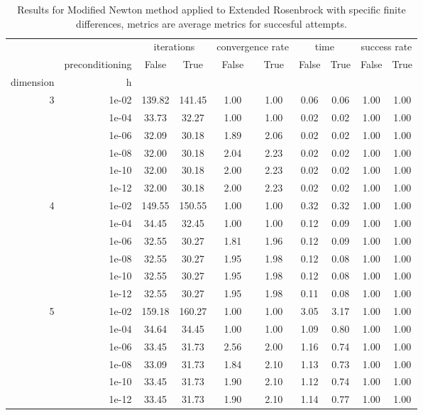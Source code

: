 \begin{table}
\centering
\caption{Results for Modified Newton method applied to Extended Rosenbrock with specific finite differences, metrics are average metrics for succesful attempts.}
\label{tab:Modified_Newton_Extended_Rosenbrock_fd_rel}
\begin{tabular}{rr|cc|cc|cc|cc}
\toprule
    &  & \multicolumn{2}{|c}{iterations} & \multicolumn{2}{|c}{convergence rate} & \multicolumn{2}{|c}{time} & \multicolumn{2}{|c}{success rate} \\
    & preconditioning & False & True & False & True & False & True & False & True \\
dimension & h &  &  &  &  &  &  &  &  \\
\midrule
\multirow[t]{6}{*}{3} & 1e-02 & 139.82 & 141.45 & 1.00 & 1.00 & 0.06 & 0.06 & 1.00 & 1.00 \\
    & 1e-04 & 33.73 & 32.27 & 1.00 & 1.00 & 0.02 & 0.02 & 1.00 & 1.00 \\
    & 1e-06 & 32.09 & 30.18 & 1.89 & 2.06 & 0.02 & 0.02 & 1.00 & 1.00 \\
    & 1e-08 & 32.00 & 30.18 & 2.04 & 2.23 & 0.02 & 0.02 & 1.00 & 1.00 \\
    & 1e-10 & 32.00 & 30.18 & 2.00 & 2.23 & 0.02 & 0.02 & 1.00 & 1.00 \\
    & 1e-12 & 32.00 & 30.18 & 2.00 & 2.23 & 0.02 & 0.02 & 1.00 & 1.00 \\
\cline{1-10}
\multirow[t]{6}{*}{4} & 1e-02 & 149.55 & 150.55 & 1.00 & 1.00 & 0.32 & 0.32 & 1.00 & 1.00 \\
    & 1e-04 & 34.45 & 32.45 & 1.00 & 1.00 & 0.12 & 0.09 & 1.00 & 1.00 \\
    & 1e-06 & 32.55 & 30.27 & 1.81 & 1.96 & 0.12 & 0.09 & 1.00 & 1.00 \\
    & 1e-08 & 32.55 & 30.27 & 1.95 & 1.98 & 0.12 & 0.08 & 1.00 & 1.00 \\
    & 1e-10 & 32.55 & 30.27 & 1.95 & 1.98 & 0.12 & 0.08 & 1.00 & 1.00 \\
    & 1e-12 & 32.55 & 30.27 & 1.95 & 1.98 & 0.11 & 0.08 & 1.00 & 1.00 \\
\cline{1-10}
\multirow[t]{6}{*}{5} & 1e-02 & 159.18 & 160.27 & 1.00 & 1.00 & 3.05 & 3.17 & 1.00 & 1.00 \\
    & 1e-04 & 34.64 & 34.45 & 1.00 & 1.00 & 1.09 & 0.80 & 1.00 & 1.00 \\
    & 1e-06 & 33.45 & 31.73 & 2.56 & 2.00 & 1.16 & 0.74 & 1.00 & 1.00 \\
    & 1e-08 & 33.09 & 31.73 & 1.84 & 2.10 & 1.13 & 0.73 & 1.00 & 1.00 \\
    & 1e-10 & 33.45 & 31.73 & 1.90 & 2.10 & 1.12 & 0.74 & 1.00 & 1.00 \\
    & 1e-12 & 33.45 & 31.73 & 1.90 & 2.10 & 1.14 & 0.77 & 1.00 & 1.00 \\
\cline{1-10}
\bottomrule
\end{tabular}
\end{table}

